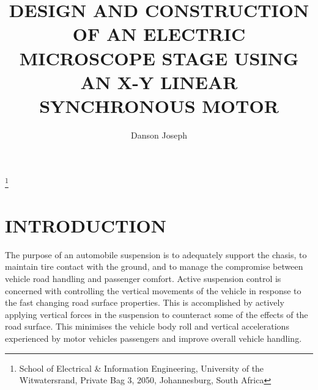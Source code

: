 \documentclass[10pt,twocolumn]{witseiepaper}
\begin{document}
\title{DESIGN AND CONSTRUCTION OF AN ELECTRIC MICROSCOPE STAGE USING AN X-Y LINEAR SYNCHRONOUS MOTOR}

\author{Danson Joseph}

\thanks{School of Electrical \& Information Engineering, University of the
Witwatersrand, Private Bag 3, 2050, Johannesburg, South Africa}



%



\maketitle
\thispagestyle{empty}\pagestyle{empty}


%
\section{INTRODUCTION}

The purpose of an automobile suspension is to adequately support the chasis, to maintain tire contact with the ground, and to manage the compromise between vehicle road handling and passenger comfort. Active suspension control is concerned with controlling the vertical movements of the vehicle in response to the fast changing road surface properties. This is accomplished by actively applying vertical forces in the suspension to counteract some of the effects of the road surface. This minimises the vehicle body roll and vertical accelerations experienced by motor vehicles passengers and improve overall vehicle handling. 
\end{document}
